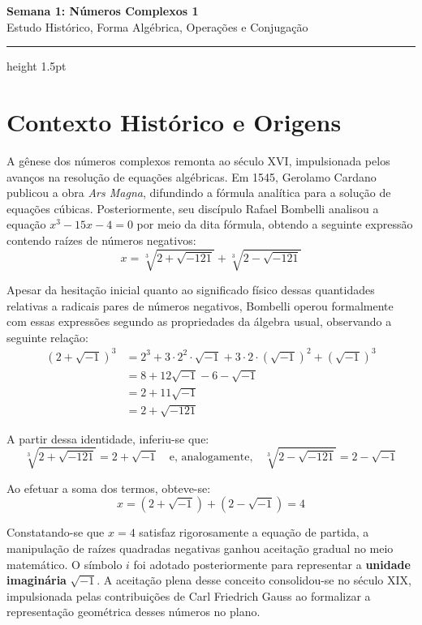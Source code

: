 \documentclass[12pt,a4paper]{article}
\begin{document}
\begin{center}
  \vspace*{-0.3cm}
  {\LARGE\bfseries\color{primary} Semana 1: Números Complexos 1} \\[0.2cm]
  {\small\sffamily\color{gray} Estudo Histórico, Forma Algébrica, Operações e Conjugação}
  \vspace*{0.3cm}
  \hrule height 1.5pt \color{primary}
\end{center}

\vspace{0.3cm}

\section{Contexto Histórico e Origens}

A gênese dos números complexos remonta ao século XVI, impulsionada pelos avanços na resolução de equações algébricas. Em 1545, Gerolamo Cardano publicou a obra \textit{Ars Magna}, difundindo a fórmula analítica para a solução de equações cúbicas. Posteriormente, seu discípulo Rafael Bombelli analisou a equação $x^3 - 15x - 4 = 0$ por meio da dita fórmula, obtendo a seguinte expressão contendo raízes de números negativos:
\[
x = \sqrt[3]{2 + \sqrt{-121}} + \sqrt[3]{2 - \sqrt{-121}}
\]

Apesar da hesitação inicial quanto ao significado físico dessas quantidades relativas a radicais pares de números negativos, Bombelli operou formalmente com essas expressões segundo as propriedades da álgebra usual, observando a seguinte relação:
\begin{align*}
(2 + \sqrt{-1})^3 &= 2^3 + 3 \cdot 2^2 \cdot \sqrt{-1} + 3 \cdot 2 \cdot (\sqrt{-1})^2 + (\sqrt{-1})^3 \\
&= 8 + 12\sqrt{-1} - 6 - \sqrt{-1} \\
&= 2 + 11\sqrt{-1} \\
&= 2 + \sqrt{-121}
\end{align*}

A partir dessa identidade, inferiu-se que:
\[
\sqrt[3]{2 + \sqrt{-121}} = 2 + \sqrt{-1} \quad \text{e, analogamente,} \quad \sqrt[3]{2 - \sqrt{-121}} = 2 - \sqrt{-1}
\]

Ao efetuar a soma dos termos, obteve-se:
\[
x = (2 + \sqrt{-1}) + (2 - \sqrt{-1}) = 4
\]

Constatando-se que $x = 4$ satisfaz rigorosamente a equação de partida, a manipulação de raízes quadradas negativas ganhou aceitação gradual no meio matemático. O símbolo $i$ foi adotado posteriormente para representar a \textbf{unidade imaginária} $\sqrt{-1}$. A aceitação plena desse conceito consolidou-se no século XIX, impulsionada pelas contribuições de Carl Friedrich Gauss ao formalizar a representação geométrica desses números no plano.
\end{document}
